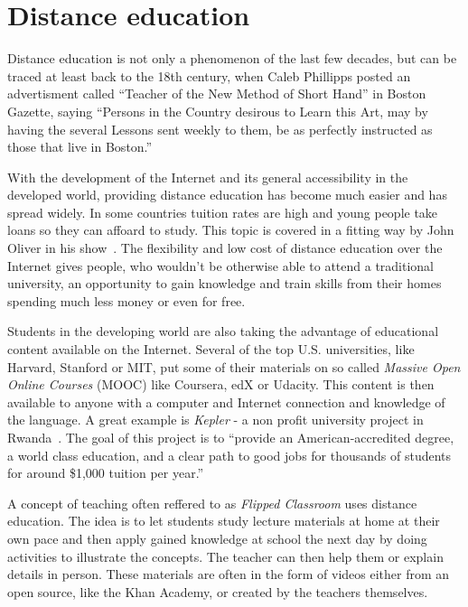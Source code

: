 \chapter{Distance education}

Distance education is not only a phenomenon of the last few decades, but can be traced at least back to the 18th century, when Caleb Phillipps posted an advertisment called ``Teacher of the New Method of Short Hand'' in Boston Gazette, saying ``Persons in the Country desirous to Learn this Art, may by having the several Lessons sent weekly to them, be as perfectly instructed as those that live in Boston.''~\cite{1}

With the development of the Internet and its general accessibility in the developed world, providing distance education has become much easier and has spread widely. In some countries tuition rates are high and young people take loans so they can affoard to study. This topic is covered in a fitting way by John Oliver in his show~\cite{2}. The flexibility and low cost of distance education over the Internet gives people, who wouldn't be otherwise able to attend a traditional university, an opportunity to gain knowledge and train skills from their homes~\cite{3} spending much less money or even for free.

Students in the developing world are also taking the advantage of educational content available on the Internet. Several of the top U.S. universities, like Harvard, Stanford or MIT, put some of their materials on so called \textit{Massive Open Online Courses} (MOOC)  like Coursera, edX or Udacity. This content is then available to anyone with a computer and Internet connection and knowledge of the language. A great example is \textit{Kepler} - a non profit university project in Rwanda~\cite{5}. The goal of this project is to ``provide an American-accredited degree, a world class education, and a clear path to good jobs for thousands of students for around \$1,000 tuition per year.''~\cite{6}

A concept of teaching often reffered to as \textit{Flipped Classroom} uses distance education. The idea is to let students study lecture materials at home at their own pace and then apply gained knowledge at school the next day by doing activities to illustrate the concepts. The teacher can then help them or explain details in person. These materials are often in the form of videos either from an open source, like the Khan Academy, or created by the teachers themselves.

